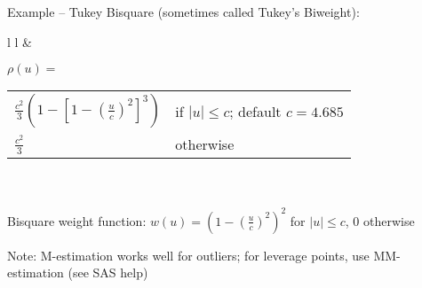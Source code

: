 \documentclass[12pt]{notes}
\begin{document}
\vspace{1em}

Example -- Tukey Bisquare (sometimes called Tukey's Biweight):\\
\begin{tabular}{l l}
\hspace{3em}
&
\begin{minipage}[t]{6in}
 $\rho(u) = $\begin{tabular}{l l} $\frac{c^2}{3} \left( 1 - [ 1 - \left(\frac{u}{c}\right)^2 ]^3 \right)$ & if $|u| \leq c$; default $c = 4.685$ \\
                                                                $\frac{c^2}{3}$ & otherwise
                                           \end{tabular}\\
       \\
       Bisquare weight function: $w(u) = \left( 1 - \left(\frac{u}{c}\right)^2\right)^2$ for $|u| \leq c$, $0$ otherwise
\end{minipage}
\end{tabular}


\vspace{1em}

Note: M-estimation works well for outliers; for leverage points, use MM-estimation (see SAS help)
\end{document}
